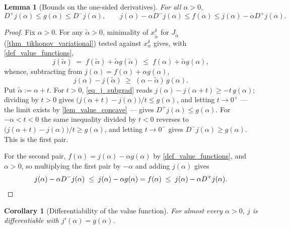 \documentclass[a4paper]{report}
\theoremstyle{plain}
\newtheorem{lemma}[theorem]{Lemma}
\newtheorem{corollary}[theorem]{Corollary}
\theoremstyle{definition}
\theoremstyle{remark}
\begin{document}
\begin{lemma}[Bounds on the one-sided derivatives]
  \label{lem_value_derivative_bounds}
  For all $\alpha > 0$,
  \[
    D^{+}j(\alpha) \le g(\alpha) \le D^{-}j(\alpha),
    \qquad
    j(\alpha) - \alpha D^{-}j(\alpha) \le f(\alpha) \le j(\alpha) - \alpha D^{+}j(\alpha) .
  \]
\end{lemma}

\begin{proof}
  Fix $\alpha > 0$.  For any $\tilde{\alpha} > 0$, minimality of $x^{\delta}
  _{\tilde{\alpha}}$ for $J_{\tilde{\alpha}}$ (\cref{thm_tikhonov_variational}) tested
  against $x^{\delta}_{\alpha}$ gives, with \cref{def_value_functions},
  \[
    j(\tilde{\alpha}) \;=\; f(\tilde{\alpha}) + \tilde{\alpha}g(\tilde{\alpha})
      \;\le\; f(\alpha) + \tilde{\alpha}g(\alpha) ,
  \]
  whence, subtracting from $j(\alpha) = f(\alpha) + \alpha g(\alpha)$,
  \begin{equation}\label{eq_j_subgrad}
    j(\alpha) - j(\tilde{\alpha}) \;\ge\; (\alpha - \tilde{\alpha})\,g(\alpha) .
  \end{equation}
  Put $\tilde{\alpha} := \alpha + t$.  For $t > 0$, \eqref{eq_j_subgrad} reads
  $j(\alpha) - j(\alpha+t) \ge -t\,g(\alpha)$; dividing by $t > 0$ gives
  $\bigl(j(\alpha+t)-j(\alpha)\bigr)/t \le g(\alpha)$, and letting $t \to 0^{+}$ --- the
  limit exists by \cref{lem_value_concave} --- gives $D^{+}j(\alpha) \le g(\alpha)$.  For
  $-\alpha < t < 0$ the same inequality divided by $t < 0$ reverses to
  $\bigl(j(\alpha+t)-j(\alpha)\bigr)/t \ge g(\alpha)$, and letting $t \to 0^{-}$ gives
  $D^{-}j(\alpha) \ge g(\alpha)$.  This is the first pair.

  For the second pair, $f(\alpha) = j(\alpha) - \alpha g(\alpha)$ by
  \cref{def_value_functions}, and $\alpha > 0$, so multiplying the first pair by
  $-\alpha$ and adding $j(\alpha)$ gives
  \[
    j(\alpha) - \alpha D^{-}j(\alpha) \;\le\; j(\alpha) - \alpha g(\alpha) = f(\alpha)
      \;\le\; j(\alpha) - \alpha D^{+}j(\alpha) . \qedhere
  \]
\end{proof}


\begin{corollary}[Differentiability of the value function]
  \label{cor_value_differentiable}
  For almost every $\alpha > 0$, $j$ is differentiable with $j'(\alpha) = g(\alpha)$.
\end{corollary}
\end{document}
